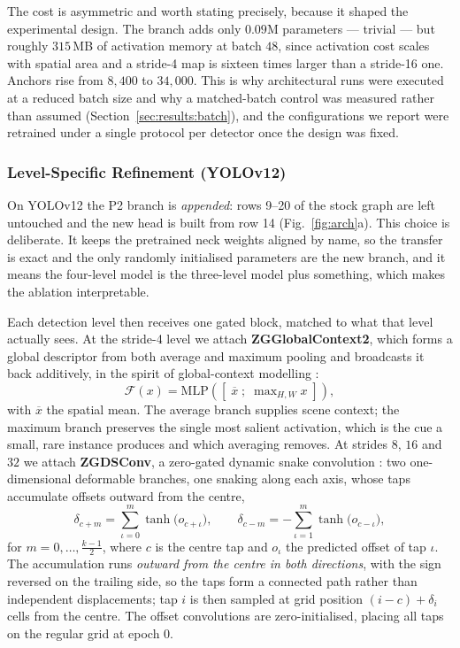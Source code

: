 \documentclass[10pt,twocolumn,a4paper]{article}
\begin{document}
The cost is asymmetric and worth stating precisely, because it shaped the
experimental design. The branch adds only $0.09$M parameters --- trivial --- but
roughly $315$\,MB of activation memory at batch $48$, since activation cost
scales with spatial area and a stride-4 map is sixteen times larger than a
stride-16 one. Anchors rise from $8{,}400$ to $34{,}000$. This is why
architectural runs were executed at a reduced batch size and why a matched-batch
control was measured rather than assumed (Section~\ref{sec:results:batch}), and
the configurations we report were retrained under a single protocol per detector
once the design was fixed.

\subsubsection{Level-Specific Refinement (YOLOv12)}

On YOLOv12 the P2 branch is \emph{appended}: rows 9--20 of the stock graph are
left untouched and the new head is built from row 14 (Fig.~\ref{fig:arch}a).
This choice is deliberate. It keeps the pretrained neck weights aligned by name,
so the transfer is exact and the only randomly initialised parameters are the
new branch, and it means the four-level model is the three-level model plus
something, which makes the ablation interpretable.

Each detection level then receives one gated block, matched to what that level
actually sees. At the stride-4 level we attach \textbf{ZGGlobalContext2}, which
forms a global descriptor from both average and maximum pooling and broadcasts
it back additively, in the spirit of global-context modelling \cite{cao2019gcnet}:
\begin{equation}
\mathcal{F}(x) = \mathrm{MLP}\left( \left[\; \overline{x} \;;\; \max\nolimits_{H,W} x \;\right] \right),
\label{eq:gctx}
\end{equation}
with $\overline{x}$ the spatial mean. The average branch supplies scene context;
the maximum branch preserves the single most salient activation, which is the
cue a small, rare instance produces and which averaging removes. At strides $8$,
$16$ and $32$ we attach \textbf{ZGDSConv}, a zero-gated dynamic snake
convolution \cite{qi2023dscnet}: two one-dimensional deformable branches, one
snaking along each axis, whose taps accumulate offsets outward from the centre,
\begin{equation}
\delta_{c+m} = \!\!\sum_{\iota=0}^{m}\! \tanh\bigl(o_{c+\iota}\bigr),
\qquad
\delta_{c-m} = -\!\!\sum_{\iota=1}^{m}\! \tanh\bigl(o_{c-\iota}\bigr),
\label{eq:snake}
\end{equation}
for $m = 0,\dots,\tfrac{k-1}{2}$, where $c$ is the centre tap and $o_\iota$ the
predicted offset of tap $\iota$. The accumulation runs \emph{outward from the
centre in both directions}, with the sign reversed on the trailing side, so the
taps form a connected path rather than independent displacements; tap $i$ is
then sampled at grid position $(i-c)+\delta_i$ cells from the centre. The offset
convolutions are zero-initialised, placing all taps on the regular grid at
epoch $0$.
\end{document}
